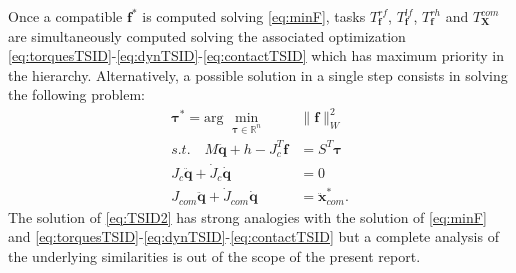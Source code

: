 \documentclass[12pt,a4paper,twoside]{article}
\begin{document}
Once a compatible $\bm f^*$ is computed solving \eqref{eq:minF}, tasks $T^{rf}_{\bm f}$, $T^{lf}_{\bm f}$, $T^{rh}_{\bm f}$ and $T^{com}_{\bm X}$ are simultaneously computed solving the associated optimization \eqref{eq:torquesTSID}-\eqref{eq:dynTSID}-\eqref{eq:contactTSID} which has maximum priority in the hierarchy. Alternatively, a possible solution in a single step consists in solving the following problem:
\begin{subequations} \label{eq:TSID2}
\begin{align} 
\label{eq:torquesTSID2}
\bm {\tau}^* = \mbox{arg } \min_{\bm \tau \in \mathbb{R}^n}\,& \| \bm f \|^2_W \\
\label{eq:dynTSID2}
s.t. \quad M \ddot{\bm q} + h - J_c^T \bm f & = S^T \bm \tau \\
\label{eq:contactTSID2}
  J_c \ddot{\bm q} + \dot{J}_c \dot{\bm q} & = 0 \\
 J_{com} \ddot{\bm q} + \dot{J}_{com} \dot{\bm q} & =  \ddot {\bm x}^*_{com}.
\end{align}
\end{subequations}
The solution of \eqref{eq:TSID2} has strong analogies with the solution of \eqref{eq:minF} and \eqref{eq:torquesTSID}-\eqref{eq:dynTSID}-\eqref{eq:contactTSID} but a complete analysis of the underlying similarities is out of the scope of the present report. 
\end{document}
